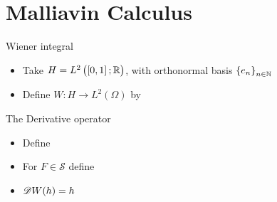 \documentclass{beamer}
\begin{document}
\section{Malliavin Calculus}
\begin{frame}{Wiener integral}
    \begin{itemize}
        \item Take $H = L^2\del{\intcc{0,1};\R }$, with orthonormal basis $\cbr{e_n}_{n\in\N}$\pause
        \item Define $W:H\to L^2(\Omega)$ by 
    \end{itemize}
\end{frame}
\begin{frame}{The Derivative operator}
    \begin{definition}
    \begin{itemize}
        \item Define \pause
        \item For $F\in\mathcal{S}$ define \pause
    \end{itemize}
    \end{definition}
    
    \vspace{-0.3cm}
    \begin{example}
    \begin{itemize}
        \item $\mathscr{D} W(h) = h$
    \end{itemize}
    \end{example}
\end{frame}
\end{document}
